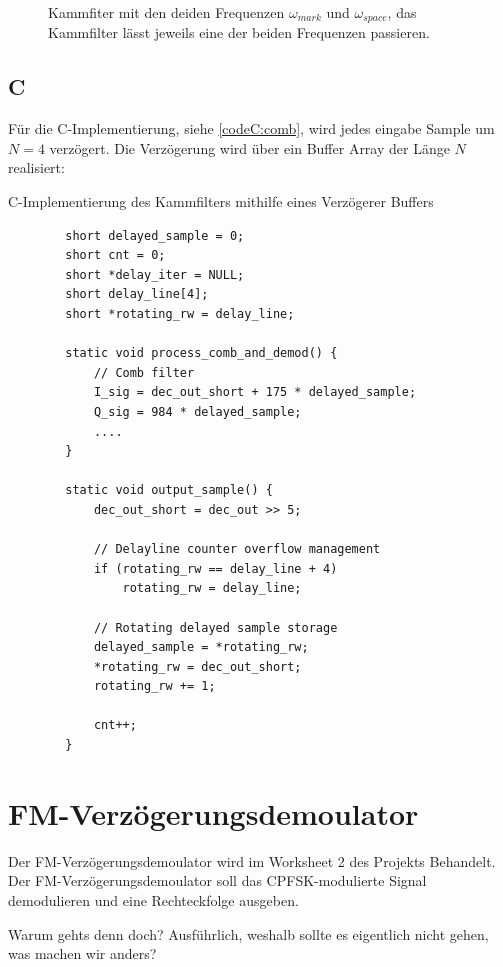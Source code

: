 \documentclass{article}
\begin{document}
\begin{figure}[!h]
    \label{fig:comb}
    \centering
    \def\svgscale{0.3}
    \def\svgwidth{0.8\columnwidth}
    
    \caption{Kammfiter mit den deiden Frequenzen $\omega_{mark}$ und $\omega_{space}$, das Kammfilter lässt jeweils eine der beiden Frequenzen passieren.}
\end{figure}
\subsection{C}
Für die C-Implementierung, siehe \ref{codeC:comb}, wird jedes eingabe Sample um $N = 4$ verzögert.
Die Verzögerung wird über ein Buffer Array der Länge $N$ realisiert:
\begin{listing}\label{codeC:comb}
    \caption{C-Implementierung des Kammfilters mithilfe eines Verzögerer Buffers}
    \begin{verbatim}
        short delayed_sample = 0;
        short cnt = 0;
        short *delay_iter = NULL;
        short delay_line[4];
        short *rotating_rw = delay_line;
 
        static void process_comb_and_demod() {
            // Comb filter
            I_sig = dec_out_short + 175 * delayed_sample;
            Q_sig = 984 * delayed_sample;
            ....
        }

        static void output_sample() {
            dec_out_short = dec_out >> 5;

            // Delayline counter overflow management
            if (rotating_rw == delay_line + 4)
                rotating_rw = delay_line;
            
            // Rotating delayed sample storage
            delayed_sample = *rotating_rw;
            *rotating_rw = dec_out_short;
            rotating_rw += 1;

            cnt++;
        }
    \end{verbatim}
\end{listing}

\section{FM-Verzögerungsdemoulator} \label{sec:fm-demod}
Der FM-Verzögerungsdemoulator wird im Worksheet 2 des Projekts Behandelt. 
Der FM-Verzögerungsdemoulator soll das CPFSK-modulierte Signal demodulieren und eine Rechteckfolge ausgeben.

Warum gehts denn doch? Ausführlich, weshalb sollte es eigentlich nicht gehen, was machen wir anders?
\end{document}
